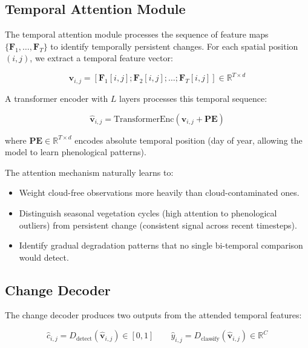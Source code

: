 \documentclass[11pt,a4paper]{article}
\begin{document}
\subsection{Temporal Attention Module}

The temporal attention module processes the sequence of feature maps $\{\mathbf{F}_1, \ldots, \mathbf{F}_T\}$ to identify temporally persistent changes.
For each spatial position $(i, j)$, we extract a temporal feature vector:

\begin{equation}
    \mathbf{v}_{i,j} = [\mathbf{F}_1[i,j]; \mathbf{F}_2[i,j]; \ldots; \mathbf{F}_T[i,j]] \in \mathbb{R}^{T \times d}
\end{equation}

A transformer encoder with $L$ layers processes this temporal sequence:

\begin{equation}
    \hat{\mathbf{v}}_{i,j} = \text{TransformerEnc}(\mathbf{v}_{i,j} + \mathbf{PE})
\end{equation}

\noindent where $\mathbf{PE} \in \mathbb{R}^{T \times d}$ encodes absolute temporal position (day of year, allowing the model to learn phenological patterns).

The attention mechanism naturally learns to:
\begin{itemize}[leftmargin=*]
    \item Weight cloud-free observations more heavily than cloud-contaminated ones.
    \item Distinguish seasonal vegetation cycles (high attention to phenological outliers) from persistent change (consistent signal across recent timesteps).
    \item Identify gradual degradation patterns that no single bi-temporal comparison would detect.
\end{itemize}

\subsection{Change Decoder}

The change decoder produces two outputs from the attended temporal features:

\begin{equation}
    \hat{c}_{i,j} = D_{\text{detect}}(\hat{\mathbf{v}}_{i,j}) \in [0, 1] \qquad \hat{y}_{i,j} = D_{\text{classify}}(\hat{\mathbf{v}}_{i,j}) \in \mathbb{R}^{C}
\end{equation}
\end{document}

